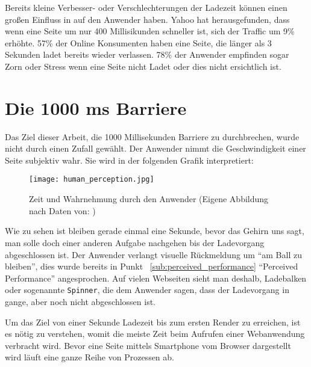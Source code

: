 		Bereits kleine Verbesser- oder Verschlechterungen der Ladezeit können einen großen Einfluss in auf den Anwender haben. Yahoo hat herausgefunden, dass wenn eine Seite um nur 400 Millisikunden schneller ist, sich der Traffic um 9\% erhöhte.\autocite{stefanov08} 57\% der Online Konsumenten haben eine Seite, die länger als 3 Sekunden ladet bereits wieder verlassen. 78\% der Anwender empfinden sogar Zorn oder Stress wenn eine Seite nicht Ladet oder dies nicht ersichtlich ist.

	\pagebreak



\section{Die 1000 ms Barriere} %
\label{sec:die_1000_ms_barriere}
	Das Ziel dieser Arbeit, die 1000 Millisekunden Barriere zu durchbrechen, wurde nicht durch einen Zufall gewählt. Der Anwender nimmt die Geschwindigkeit einer Seite subjektiv wahr. Sie wird in der folgenden Grafik interpretiert:

	\begin{figure}[htbp]
		\begin{center}
			\texttt{[image: human\_perception.jpg]}
			\caption{Zeit und Wahrnehmung durch den Anwender (Eigene Abbildung nach Daten von: \autocite{grigorikHumanPerception})}
			\label{fig:human_perception}
		\end{center}
	\end{figure}

	Wie zu sehen ist bleiben gerade einmal eine Sekunde, bevor das Gehirn uns sagt, man solle doch einer anderen Aufgabe nachgehen bis der Ladevorgang abgeschlossen ist. Der Anwender verlangt visuelle Rückmeldung um "`am Ball zu bleiben"', dies wurde bereits in Punkt ~\ref{sub:perceived_performance} "`Perceived Performance"' angesprochen. Auf vielen Webseiten sieht man deshalb, Ladebalken oder sogenannte \texttt{Spinner}, die dem Anwender sagen, dass der Ladevorgang in gange, aber noch nicht abgeschlossen ist.

	Um das Ziel von einer Sekunde Ladezeit bis zum ersten Render zu erreichen, ist es nötig zu verstehen, womit die meiste Zeit beim Aufrufen einer Webanwendung verbracht wird. Bevor eine Seite mittels Smartphone vom Browser dargestellt wird läuft eine ganze Reihe von Prozessen ab.



